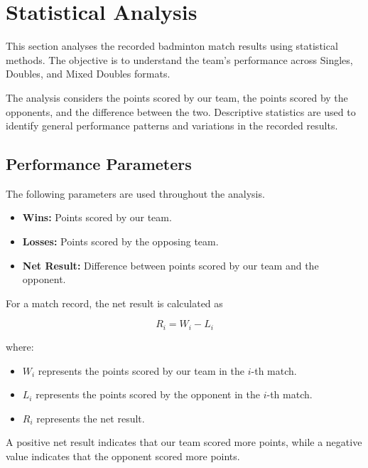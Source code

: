 
\section{Statistical Analysis}

This section analyses the recorded badminton match
results using statistical methods. The objective is to
understand the team's performance across Singles,
Doubles, and Mixed Doubles formats.

The analysis considers the points scored by our team,
the points scored by the opponents, and the difference
between the two. Descriptive statistics are used to
identify general performance patterns and variations
in the recorded results.

\subsection{Performance Parameters}

The following parameters are used throughout the
analysis.

\begin{itemize}

    \item \textbf{Wins:} Points scored by our team.

    \item \textbf{Losses:} Points scored by the
    opposing team.

    \item \textbf{Net Result:} Difference between
    points scored by our team and the opponent.

\end{itemize}

For a match record, the net result is calculated as

\[
R_i = W_i - L_i
\]

where:

\begin{itemize}
    \item $W_i$ represents the points scored by our
    team in the $i$-th match.
    \item $L_i$ represents the points scored by the
    opponent in the $i$-th match.
    \item $R_i$ represents the net result.
\end{itemize}

A positive net result indicates that our team scored
more points, while a negative value indicates that
the opponent scored more points.

